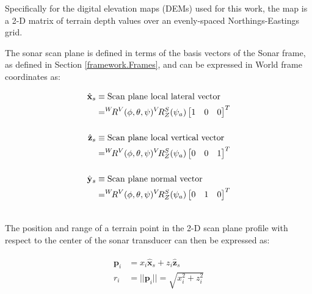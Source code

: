 \noindent Specifically for the digital elevation maps (DEMs) used for this work, the map is a 2-D matrix of terrain depth values over an evenly-spaced Northings-Eastings grid.

The sonar scan plane is defined in terms of the basis vectors of the Sonar frame, as defined in Section \ref{framework.Frames}, and can be expressed in World frame coordinates as:

\begin{align}
\begin{split}
\hat{\mathbf{x}}_s &\equiv \text{Scan plane local lateral vector} \\
&= ^{W}\hspace{-1ex}R^{V}(\phi, \theta, \psi) ^{V}\hspace{-0.4ex}R_Z^{S} (\psi_a)\begin{bmatrix} 1 & 0 & 0 \end{bmatrix}^{T} \\ \\
\hat{\mathbf{z}}_s &\equiv \text{Scan plane local vertical vector} \\
&= ^{W}\hspace{-1ex}R^{V}(\phi, \theta, \psi) ^{V}\hspace{-0.4ex}R_Z^{S} (\psi_a) \begin{bmatrix} 0 & 0 & 1 \end{bmatrix}^{T} \\ \\
\hat{\mathbf{y}}_s &\equiv \text{Scan plane normal vector} \\
&= ^{W}\hspace{-1ex}R^{V}(\phi, \theta, \psi) ^{V}\hspace{-0.4ex}R_Z^{S} (\psi_a) \begin{bmatrix} 0 & 1 & 0 \end{bmatrix}^{T}  \\ \\
\end{split}
\label{eq:scanPlane}
\end{align}

The position and range of a terrain point in the 2-D scan plane profile with respect to the center of the sonar transducer can then be expressed as:

\begin{align}
\begin{split}
\mathbf{p}_i &= x_i \hat{\mathbf{x}}_s + z_i \hat{\mathbf{z}}_s \\
r_i &= || \mathbf{p}_i || = \sqrt{x_i^{2} + z_i^2}
\end{split}
\label{eq:posRange}
\end{align}

